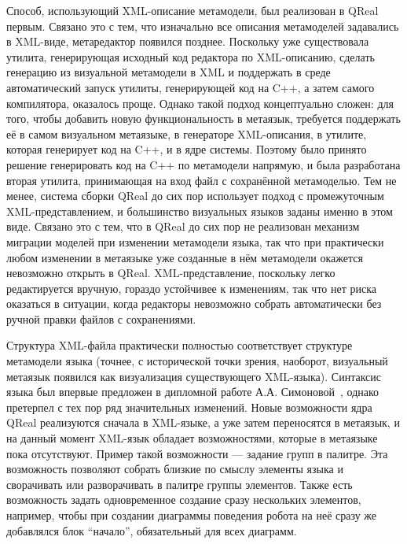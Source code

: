Способ, использующий XML-описание метамодели, был реализован в QReal первым. Связано 
это с тем, что изначально все описания метамоделей задавались в XML-виде, метаредактор 
появился позднее. Поскольку уже существовала утилита, генерирующая исходный код редактора 
по XML-описанию, сделать генерацию из визуальной метамодели в XML и поддержать в среде 
автоматический запуск утилиты, генерирующей код на C++, а затем самого компилятора, 
оказалось проще. Однако такой подход концептуально сложен: для того, чтобы добавить 
новую функциональность в метаязык, требуется поддержать её в самом визуальном метаязыке, 
в генераторе XML-описания, в утилите, которая генерирует код на C++, и в ядре системы. 
Поэтому было принято решение генерировать код на C++ по метамодели напрямую, и была 
разработана вторая утилита,  принимающая на вход файл с сохранённой метамоделью. Тем 
не менее, система сборки QReal до сих пор использует подход с промежуточным XML-представлением, 
и большинство визуальных языков заданы именно в этом виде. Связано это с тем, что в 
QReal до сих пор не реализован механизм миграции моделей при изменении метамодели 
языка, так что при практически любом изменении в метаязыке уже созданные в нём метамодели 
окажется невозможно открыть в QReal. XML-представление, поскольку легко редактируется 
вручную, гораздо устойчивее к изменениям, так что нет риска оказаться в ситуации, когда 
редакторы невозможно собрать автоматически без ручной правки файлов с сохранениями. 

Структура XML-файла практически полностью соответствует структуре метамодели языка 
(точнее, с исторической точки зрения, наоборот, визуальный метаязык появился как визуализация 
существующего XML-языка). Синтаксис языка был впервые предложен в дипломной работе А.А. Симоновой~\cite{simonova2007diploma}, 
однако претерпел с тех пор ряд значительных изменений. Новые возможности ядра QReal 
реализуются сначала в XML-языке, а уже затем переносятся в метаязык, и на данный момент 
XML-язык обладает возможностями, которые в метаязыке пока отсутствуют. Пример такой 
возможности --- задание групп в палитре. Эта возможность позволяют собрать близкие 
по смыслу элементы языка и сворачивать или разворачивать в палитре группы элементов. 
Также есть возможность задать одновременное создание сразу нескольких элементов, например, 
чтобы при создании диаграммы поведения робота на неё сразу же добавлялся блок "`начало"', 
обязательный для всех диаграмм.

